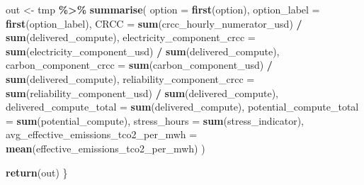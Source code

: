 \documentclass[
]{article}
\newenvironment{Shaded}{\begin{snugshade}}{\end{snugshade}}
\newcommand{\AttributeTok}[1]{\textcolor[rgb]{0.13,0.29,0.53}{#1}}
\newcommand{\FunctionTok}[1]{\textcolor[rgb]{0.13,0.29,0.53}{\textbf{#1}}}
\newcommand{\NormalTok}[1]{#1}
\newcommand{\OtherTok}[1]{\textcolor[rgb]{0.56,0.35,0.01}{#1}}
\newcommand{\SpecialCharTok}[1]{\textcolor[rgb]{0.81,0.36,0.00}{\textbf{#1}}}
\begin{document}
\begin{Shaded}
\begin{Highlighting}[]
\NormalTok{  out }\OtherTok{\textless{}{-}}\NormalTok{ tmp }\SpecialCharTok{\%\textgreater{}\%}
    \FunctionTok{summarise}\NormalTok{(}
      \AttributeTok{option =} \FunctionTok{first}\NormalTok{(option),}
      \AttributeTok{option\_label =} \FunctionTok{first}\NormalTok{(option\_label),}
      \AttributeTok{CRCC =}
        \FunctionTok{sum}\NormalTok{(crcc\_hourly\_numerator\_usd) }\SpecialCharTok{/} \FunctionTok{sum}\NormalTok{(delivered\_compute),}
      \AttributeTok{electricity\_component\_crcc =}
        \FunctionTok{sum}\NormalTok{(electricity\_component\_usd) }\SpecialCharTok{/} \FunctionTok{sum}\NormalTok{(delivered\_compute),}
      \AttributeTok{carbon\_component\_crcc =}
        \FunctionTok{sum}\NormalTok{(carbon\_component\_usd) }\SpecialCharTok{/} \FunctionTok{sum}\NormalTok{(delivered\_compute),}
      \AttributeTok{reliability\_component\_crcc =}
        \FunctionTok{sum}\NormalTok{(reliability\_component\_usd) }\SpecialCharTok{/} \FunctionTok{sum}\NormalTok{(delivered\_compute),}
      \AttributeTok{delivered\_compute\_total =} \FunctionTok{sum}\NormalTok{(delivered\_compute),}
      \AttributeTok{potential\_compute\_total =} \FunctionTok{sum}\NormalTok{(potential\_compute),}
      \AttributeTok{stress\_hours =} \FunctionTok{sum}\NormalTok{(stress\_indicator),}
      \AttributeTok{avg\_effective\_emissions\_tco2\_per\_mwh =} \FunctionTok{mean}\NormalTok{(effective\_emissions\_tco2\_per\_mwh)}
\NormalTok{    )}

  \FunctionTok{return}\NormalTok{(out)}
\NormalTok{\}}


\end{Highlighting}
\end{Shaded}
\end{document}
